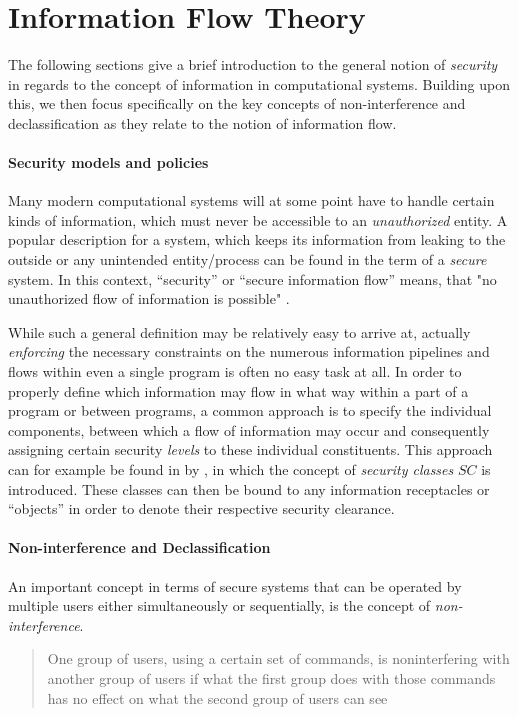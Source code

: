 
\section{Information Flow Theory} 
The following sections give a brief introduction to the general notion of \emph{security} in regards to the concept of information in computational systems.
Building upon this, we then focus specifically on the key concepts of non-interference and declassification as they relate to the notion of information flow.
\paragraph{Security models and policies}
Many modern computational systems will at some point have to handle certain kinds of information, which must never be accessible to an \emph{unauthorized} entity.
A popular description for a system, which keeps its information from leaking to the outside or any unintended entity/process can be found in the term of a  \emph{secure} system.
In this context, ``security'' or ``secure information flow'' means, that "no unauthorized flow of information is possible" \cite{lattice_model_security}.

While such a general definition may be relatively easy to arrive at, actually \emph{enforcing} the necessary constraints on the numerous information pipelines and flows within even a single program is often no easy task at all. 
In order to properly define which information may flow in what way within a part of a program or between programs, a common approach is to specify the individual components, between which a flow of information may occur and consequently assigning certain security \emph{levels} to these individual constituents. This approach can for example be found in \cite{lattice_model_security} by \citeauthor{lattice_model_security}, in which the concept of \emph{security classes} \(SC\) is introduced. These classes can then be bound to any information receptacles or ``objects'' in order to denote their respective security clearance.
\paragraph{Non-interference and Declassification}
\label{ref:Declass_and_Inter}
An important concept in terms of secure systems that can be operated by multiple users either simultaneously or sequentially, is the concept of \emph{non-interference}.
\begin{quotation}
    One group of users, using a certain set of commands, is noninterfering with another group of users if what the first group does with those commands has no effect on what the second group of users can see
\end{quotation}


